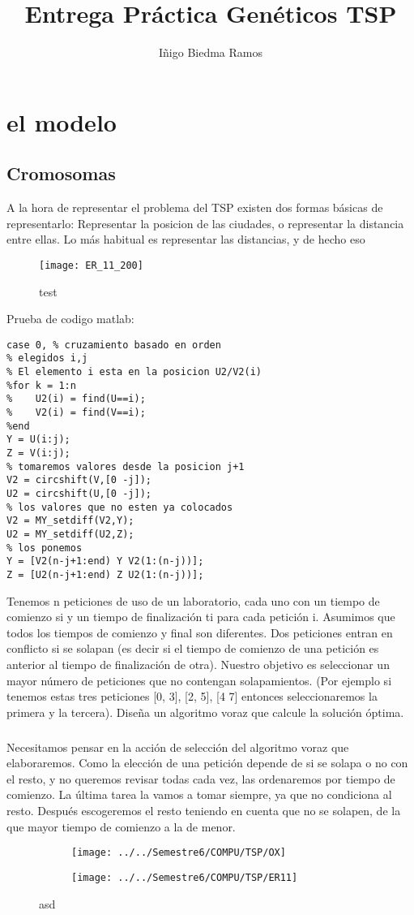 \documentclass[10pt,a4paper]{article}
\author{Iñigo Biedma Ramos}
\title{Entrega Práctica Genéticos TSP}
\date{}
\begin{document}
\maketitle
\section{el modelo}
\subsection{Cromosomas}
A la hora de representar el problema del TSP existen dos formas básicas de representarlo: Representar la posicion de las ciudades, o representar la distancia entre ellas. Lo más habitual es representar las distancias, y de hecho eso 
\begin{figure}[H]
	\centering
	
	\texttt{[image: ER\_11\_200]}
	\caption{test}
\end{figure}
Prueba de codigo matlab:
\begin{verbatim}
case 0, % cruzamiento basado en orden
% elegidos i,j
% El elemento i esta en la posicion U2/V2(i)
%for k = 1:n 
%    U2(i) = find(U==i);
%    V2(i) = find(V==i);
%end
Y = U(i:j);
Z = V(i:j);
% tomaremos valores desde la posicion j+1
V2 = circshift(V,[0 -j]);
U2 = circshift(U,[0 -j]);
% los valores que no esten ya colocados
V2 = MY_setdiff(V2,Y);
U2 = MY_setdiff(U2,Z);
% los ponemos
Y = [V2(n-j+1:end) Y V2(1:(n-j))];
Z = [U2(n-j+1:end) Z U2(1:(n-j))];
\end{verbatim}
Tenemos n peticiones de uso de un laboratorio, cada uno con un tiempo de comienzo si y un tiempo de finalización ti para cada petición i. Asumimos que todos los tiempos de comienzo y final son diferentes. Dos peticiones entran en conflicto si se solapan (es decir si el tiempo de comienzo de una petición es anterior al tiempo de finalización de otra). Nuestro objetivo es seleccionar un mayor número de peticiones que no contengan solapamientos. (Por ejemplo si tenemos estas tres peticiones [0, 3], [2, 5], [4 7] entonces seleccionaremos la primera y la tercera). Diseña un algoritmo voraz que calcule la solución óptima.
\subparagraph{}
Necesitamos pensar en la acción de selección del algoritmo voraz que elaboraremos. Como la elección de una petición depende de si se solapa o no con el resto, y no queremos revisar todas cada vez, las ordenaremos por tiempo de comienzo. La última tarea la vamos a tomar siempre, ya que no condiciona al resto. Después escogeremos el resto teniendo en cuenta que no se solapen, de la que mayor tiempo de comienzo a la de menor. \\
\begin{figure}
	\centering
	\begin{subfigure}[t]{0.45\textwidth}
	\texttt{[image: ../../Semestre6/COMPU/TSP/OX]}
	\end{subfigure}
	\centering
	\begin{subfigure}[t]{0.45\textwidth}
	\texttt{[image: ../../Semestre6/COMPU/TSP/ER11]}
	\end{subfigure}
	\caption{asd}
	\label{fig:OX}
\end{figure}
\end{document}
